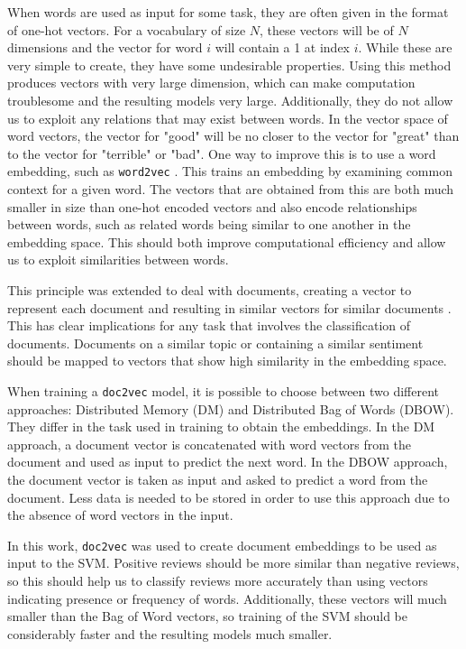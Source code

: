 \documentclass[twocolumn]{article}
\begin{document}
When words are used as input for some task, they are often given in the format of one-hot vectors. For a vocabulary of size $N$, these vectors will be of $N$ dimensions and the vector for word $i$ will contain a 1 at index $i$. While these are very simple to create, they have some undesirable properties. Using this method produces vectors with very large dimension, which can make computation troublesome and the resulting models very large. Additionally, they do not allow us to exploit any relations that may exist between words. In the vector space of word vectors, the vector for "good" will be no closer to the vector for "great" than to the vector for "terrible" or "bad". One way to improve this is to use a word embedding, such as \texttt{word2vec} \cite{NIPS2013_5021}. This trains an embedding by examining common context for a given word. The vectors that are obtained from this are both much smaller in size than one-hot encoded vectors and also encode relationships between words, such as related words being similar to one another in the embedding space. This should both improve computational efficiency and allow us to exploit similarities between words.

This principle was extended to deal with documents, creating a vector to represent each document and resulting in similar vectors for similar documents \cite{doc2vec}. This has clear implications for any task that involves the classification of documents. Documents on a similar topic or containing a similar sentiment should be mapped to vectors that show high similarity in the embedding space.

When training a \texttt{doc2vec} model, it is possible to choose between two different approaches: Distributed Memory (DM) and Distributed Bag of Words (DBOW). They differ in the task used in training to obtain the embeddings. In the DM approach, a document vector is concatenated with word vectors from the document and used as input to predict the next word. In the DBOW approach, the document vector is taken as input and asked to predict a word from the document. Less data is needed to be stored in order to use this approach due to the absence of word vectors in the input.

In this work, \texttt{doc2vec} was used to create document embeddings to be used as input to the SVM. Positive reviews should be more similar than negative reviews, so this should help us to classify reviews more accurately than using vectors indicating presence or frequency of words. Additionally, these vectors will much smaller than the Bag of Word vectors, so training of the SVM should be considerably faster and the resulting models much smaller.
\end{document}
